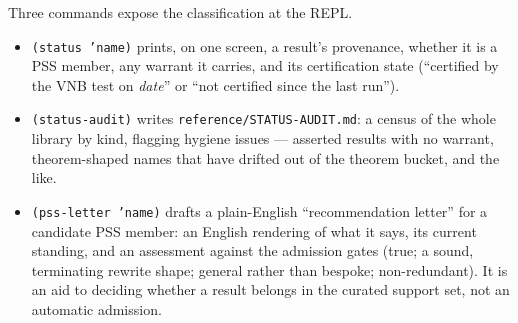 Three commands expose the classification at the REPL.

\begin{itemize}
\item \texttt{(status 'name)} prints, on one screen, a result's
  provenance, whether it is a PSS member, any warrant it carries, and its
  certification state (``certified by the VNB test on \textit{date}'' or
  ``not certified since the last run'').

\item \texttt{(status-audit)} writes \texttt{reference/STATUS-AUDIT.md}: a
  census of the whole library by kind, flagging hygiene issues --- asserted
  results with no warrant, theorem-shaped names that have drifted out of
  the theorem bucket, and the like.

\item \texttt{(pss-letter 'name)} drafts a plain-English ``recommendation
  letter'' for a candidate PSS member: an English rendering of what it
  says, its current standing, and an assessment against the admission
  gates (true; a sound, terminating rewrite shape; general rather than
  bespoke; non-redundant).  It is an aid to deciding whether a result
  belongs in the curated support set, not an automatic admission.
\end{itemize}
